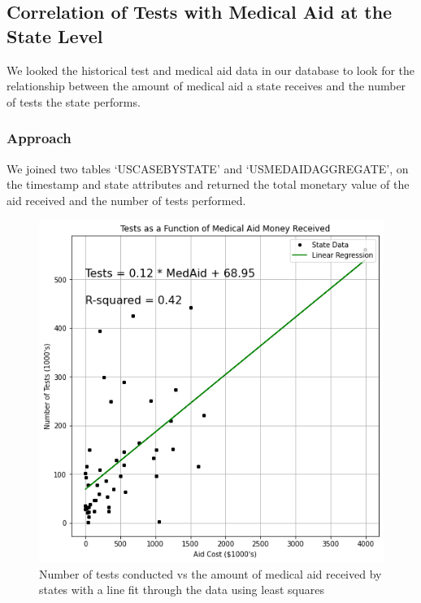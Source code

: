 \documentclass[11pt]{article}
\begin{document}
\pagebreak

\subsection{Correlation of Tests with Medical Aid at the State Level}
\noindent
We looked the historical test and medical aid data in our database to look for the relationship between the amount of medical aid a state receives and the number of tests the state performs. 

\subsubsection{Approach}
We joined two tables `USCASEBYSTATE' and `USMEDAIDAGGREGATE', on the timestamp and state attributes and returned the total monetary value of the aid received and the number of tests performed. 

\FloatBarrier
\begin{figure}[h]
    \centering
    \includegraphics[scale=0.5]{diagrams/analysis/medaid_corr_no_outliers.png}
    \caption{Number of tests conducted vs the amount of medical aid received by states with a line fit through the data using least squares}
    \label{fig:test_cost_fit}
\end{figure}
\FloatBarrier
\end{document}
